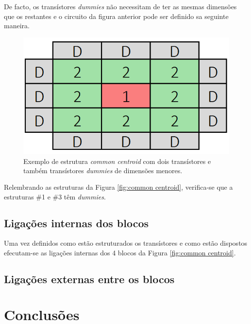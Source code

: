 \documentclass[11pt]{article}
\numberwithin{equation}{section}
\begin{document}
De facto, os transístores \textit{dummies} não necessitam de ter as mesmas dimensões que os restantes e o circuito da figura anterior pode ser definido sa seguinte maneira.

\begin{figure}[H]
	\centering
	\includegraphics[keepaspectratio=true, scale=0.35]{teoricas/dummy3}
	\vspace{-0.5em}
	\caption{Exemplo de estrutura \textit{common centroid} com dois transístores e também transístores \textit{dummies} de dimensões menores.}
	\vspace{-0.8em}
\end{figure}

Relembrando as estruturas da Figura \ref{fig:common centroid}, verifica-se que a estruturas \#1 e \#3 têm \textit{dummies}. 

\subsection{Ligações internas dos blocos}

Uma vez definidos como estão estruturados os transístores e como estão dispostos efecutam-se as ligações internas dos 4 blocos da Figura \ref{fig:common centroid}.

\subsection{Ligações externas entre os blocos}

\pagebreak

\section{Conclusões}
\end{document}
